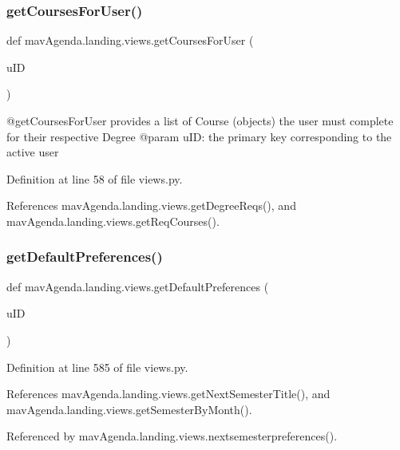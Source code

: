 \subsubsection{\texorpdfstring{get\+Courses\+For\+User()}{getCoursesForUser()}}
{\footnotesize\ttfamily def mav\+Agenda.\+landing.\+views.\+get\+Courses\+For\+User (\begin{DoxyParamCaption}\item[{}]{u\+ID }\end{DoxyParamCaption})}

\begin{DoxyVerb}@getCoursesForUser provides a list of Course (objects) the user must complete for their respective Degree
@param uID: the primary key corresponding to the active user
\end{DoxyVerb}
 

Definition at line 58 of file views.\+py.



References mav\+Agenda.\+landing.\+views.\+get\+Degree\+Reqs(), and mav\+Agenda.\+landing.\+views.\+get\+Req\+Courses().

\mbox{\label{namespacemavAgenda_1_1landing_1_1views_abf63ccc16307602c6e3cd8cdd0a27439}} 
\subsubsection{\texorpdfstring{get\+Default\+Preferences()}{getDefaultPreferences()}}
{\footnotesize\ttfamily def mav\+Agenda.\+landing.\+views.\+get\+Default\+Preferences (\begin{DoxyParamCaption}\item[{}]{u\+ID }\end{DoxyParamCaption})}



Definition at line 585 of file views.\+py.



References mav\+Agenda.\+landing.\+views.\+get\+Next\+Semester\+Title(), and mav\+Agenda.\+landing.\+views.\+get\+Semester\+By\+Month().



Referenced by mav\+Agenda.\+landing.\+views.\+nextsemesterpreferences().

